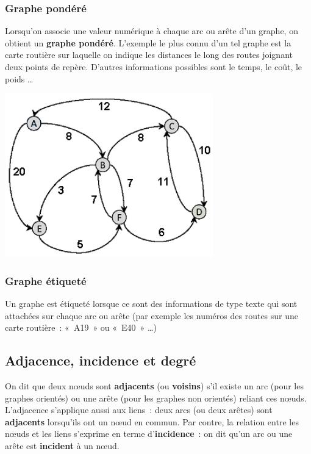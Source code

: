 		\subsubsection{Graphe pondéré}
			
			Lorsqu'on associe une valeur numérique à chaque arc ou 
			arête d'un graphe, on obtient un \textbf{graphe pondéré}.
			L'exemple le plus connu d'un tel graphe est la carte routière 
			sur laquelle on indique les distances le long des routes
			joignant deux points de repère. D'autres informations possibles 
			sont le temps, le coût, le poids {\dots}

			\begin{center}
			\includegraphics[width=9.038cm,height=7.091cm]{image/a2012Logique2eme-img045.png} 
			\end{center}
			
		\subsubsection{Graphe étiqueté}
		
			Un graphe est étiqueté lorsque ce sont des informations 
			de type texte qui sont attachées sur chaque arc ou arête (par
			exemple les numéros des routes sur une carte routière~: «~A19~» ou «~E40~» {\dots})


	\subsection{Adjacence, incidence et degré}
		
		On dit que deux n{\oe}uds sont \textbf{adjacents} 
		(ou \textbf{voisins}) s'il existe un arc (pour les graphes orientés)
		ou une arête (pour les graphes non orientés) reliant ces n{\oe}uds. 
		L'adjacence s'applique aussi aux liens~: deux arcs (ou deux arêtes) 
		sont \textbf{adjacents} lorsqu'ils ont un n{\oe}ud en commun. 
		Par contre, la relation entre les n{\oe}uds et les liens s'exprime 
		en terme d'\textbf{incidence}~: on dit qu'un arc ou une arête est 
		\textbf{incident} à un n{\oe}ud.

